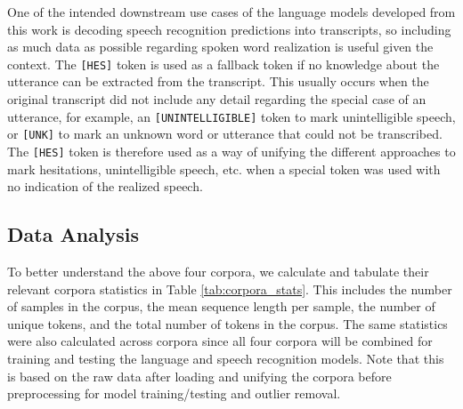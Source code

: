 \documentclass[12pt]{article}
\begin{document}
One of the intended downstream use cases of the language models developed from this work is decoding speech recognition predictions into transcripts,
so including as much data as possible regarding spoken word realization is useful given the context. The \lstinline|[HES]| token is used as a
fallback token if no knowledge about the utterance can be extracted from the transcript. This usually occurs when the original transcript did not
include any detail regarding the special case of an utterance, for example, an \lstinline|[UNINTELLIGIBLE]| token to mark unintelligible speech, or
\lstinline|[UNK]| to mark an unknown word or utterance that could not be transcribed. The \lstinline|[HES]| token is therefore used as a way of
unifying the different approaches to mark hesitations, unintelligible speech, etc. when a special token was used with no indication of the realized
speech.

\subsection{Data Analysis}\label{sec:data_analysis}
To better understand the above four corpora, we calculate and tabulate their relevant corpora statistics in Table \ref{tab:corpora_stats}. This
includes the number of samples in the corpus, the mean sequence length per sample, the number of unique tokens, and the total number of tokens in the
corpus. The same statistics were also calculated across corpora since all four corpora will be combined for training and testing the language and
speech recognition models. Note that this is based on the raw data after loading and unifying the corpora before preprocessing for model
training/testing and outlier removal.
\end{document}
